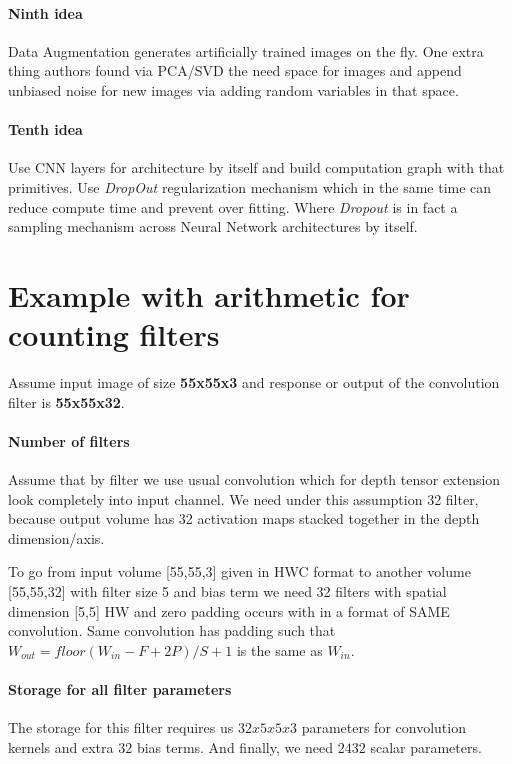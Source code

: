 \documentclass[12pt,a4paper]{article}
\theoremstyle{plain}
\begin{document}
\paragraph{Ninth idea} Data Augmentation generates artificially trained images on the fly. One extra thing authors found via PCA/SVD the need space for images and append unbiased noise for new images via adding random variables in that space.

\paragraph{Tenth idea} Use CNN layers for architecture by itself and build computation graph with that primitives. Use \textit{DropOut} regularization mechanism which in the same  time can reduce compute time and prevent over fitting. Where \textit{Dropout} is in fact a sampling mechanism across Neural Network architectures by itself.

\section{Example with arithmetic for counting filters}
Assume input image of size \textbf{55x55x3} and response or output of the convolution filter is \textbf{55x55x32}.

\paragraph{Number of filters}
Assume that by filter we use usual convolution which for depth tensor extension look completely into input channel.  We need under this assumption 32 filter, because output volume has 32 activation maps stacked together in the depth dimension/axis.

To go from input volume [55,55,3] given in HWC format to another volume [55,55,32] with filter size 5 and bias term we need 32 filters with spatial dimension [5,5] HW and zero padding occurs with in a format of SAME convolution.
Same convolution has padding such that $W_{out} = floor(W_{in} - F + 2P)/S + 1$ is the same as $W_{in}$.

\paragraph{Storage for all filter parameters}
The storage for this filter requires us $32x5x5x3$ parameters for convolution kernels and extra $32$ bias terms. And finally, we need $2432$ scalar parameters.
\end{document}
